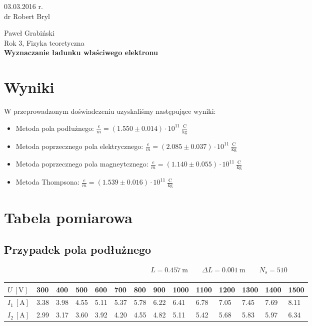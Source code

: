 \documentclass[paper=a4, fontsize=12pt]{scrartcl}
\begin{document}
\begin{flushright}
03.03.2016 r.\\
dr Robert Bryl
\end{flushright}Paweł Grabiński\\
Rok 3, Fizyka teoretyczna\\[0.5cm]
{\huge \bf Wyznaczanie ładunku właściwego elektronu}
\section{Wyniki}
W przeprowadzonym doświadczeniu uzyskaliśmy następujące wyniki:
\begin{itemize}
	\item Metoda pola podłużnego: $\frac{e}{m}=(1.550\pm0.014)\cdot10^{11}\:\mathrm{\frac{C}{kg}}$
	\item Metoda poprzecznego pola elektrycznego: $\frac{e}{m}= (2.085\pm0.037)\cdot10^{11}\:\mathrm{\frac{C}{kg}}$
	\item Metoda poprzecznego pola magneytcznego: $\frac{e}{m}=(1.140\pm0.055)\cdot10^{11}\:\mathrm{\frac{C}{kg}}$
	\item Metoda Thompsona: $\frac{e}{m}= (1.539\pm0.016)\cdot10^{11}\:\mathrm{\frac{C}{kg}}$
\end{itemize}
\section{Tabela pomiarowa}
\subsection{Przypadek pola podłużnego}
\begin{align*}
L=0.457\:\mathrm{m} \qquad \Delta L=0.001 \:\mathrm{m} \qquad N_s=510 
\end{align*}
\begin{table}[h]
	\begin{tabular}{|l|l|l|l|l|l|l|l|l|l|l|l|l|l|}
		\hline
		$U\:[\mathrm{V}]$ & 300  & 400  & 500  & 600  & 700  & 800  & 900  & 1000 & 1100 & 1200 & 1300 & 1400 & 1500 \\ \hline
		$I_1\:[\mathrm{A}]$ & 3.38 & 3.98 & 4.55 & 5.11 & 5.37 & 5.78 & 6.22 & 6.41 & 6.78 & 7.05 & 7.45 & 7.69 & 8.11 \\ \hline
		$I_2\:[\mathrm{A}]$ & 2.99 & 3.17 & 3.60 & 3.92 & 4.20 & 4.55 & 4.82 & 5.11 & 5.42 & 5.68 & 5.83 & 5.97 & 6.34 \\ \hline
	\end{tabular}
\end{table}
\end{document}
